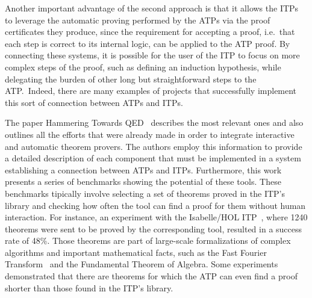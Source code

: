 Another important advantage of the second approach is that it allows the ITPs to leverage the automatic proving performed by the ATPs via the proof certificates they produce, since the requirement for accepting a proof, i.e.\ that each step is correct to its internal logic, can be applied to the ATP proof.
%
By connecting these systems, it is possible for the user of the ITP to focus on more complex steps of the proof, such as defining an induction hypothesis, while delegating the burden of other long but straightforward steps to the ATP.\
Indeed, there are many examples of projects that successfully
implement this sort of connection between ATPs and ITPs.

The paper Hammering Towards QED~\cite{hammering} describes
the most relevant ones and also outlines
all the efforts that were already made in order to integrate
interactive and automatic theorem provers. The authors employ
this information to provide a detailed description of each
component that must be implemented in a system establishing
a connection between ATPs and ITPs. Furthermore, this work
presents a series of benchmarks showing the potential of these
tools. These benchmarks tipically involve selecting a set
of theorems proved in the ITP's library and checking how often the
tool can find a proof for them without human interaction.
For instance, an experiment with the Isabelle/HOL ITP~\cite{Nipkow2002}, where
1240 theorems were sent to be proved by the corresponding tool,
resulted in a success rate of 48\%.
Those theorems are part of large-scale formalizations of complex algorithms and important mathematical facts,
such as the Fast Fourier Transform~\cite{fft} and the Fundamental Theorem of Algebra.
Some experiments demonstrated that there are theorems for which
the ATP can even find a proof shorter than those found in the ITP's library.
